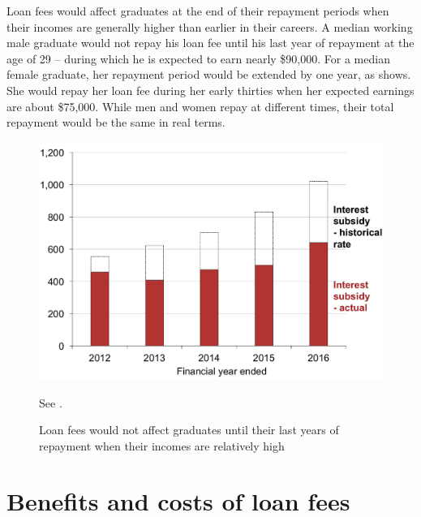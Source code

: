 \documentclass{grattan}
\begin{document}
\Gls{Loan fees} would affect graduates at the end of their repayment periods when their incomes are generally higher than earlier in their careers.
A median working male graduate would not repay his loan fee until his last year of repayment at the age of 29 -- during which he is expected to earn nearly \$90,000.
For a median female graduate, her repayment period would be extended by one year, as  shows.
She would repay her loan fee during her early thirties when her expected earnings are about \$75,000.
While men and women repay at different times, their total repayment would be the same in real terms.

\begin{figure}
\caption{\Gls{Loan fees} would not affect graduates until their last years of repayment when their incomes are relatively high}\label{fig:fig21-loan-fees-would-not-affect-grads-until-their-last-years-of-repayment-when-their-incomes-are-relatively-high}


\includegraphics[page=21]{atlas/Chartpack.pdf}

{See .}
\end{figure}
\endgroup
\section{Benefits and costs of loan fees}\label{sec:benefits-and-costs-of-loan-fees}
\end{document}
